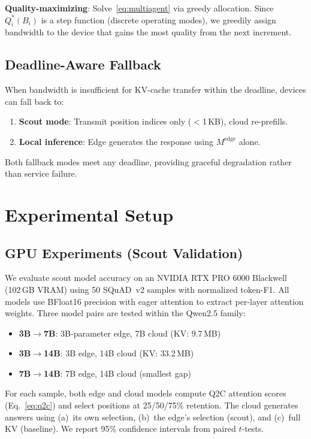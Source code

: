 \documentclass[conference]{IEEEtran}
\begin{document}
\textbf{Quality-maximizing}: Solve~\eqref{eq:multiagent} via greedy allocation.
Since $Q_i^*(B_i)$ is a step function (discrete operating modes), we greedily assign bandwidth to the device that gains the most quality from the next increment.

\subsection{Deadline-Aware Fallback}

When bandwidth is insufficient for KV-cache transfer within the deadline, devices can fall back to:
\begin{enumerate}
    \item \textbf{Scout mode}: Transmit position indices only ($<$1\,KB), cloud re-prefills.
    \item \textbf{Local inference}: Edge generates the response using $M^{\text{edge}}$ alone.
\end{enumerate}
Both fallback modes meet any deadline, providing graceful degradation rather than service failure.


\section{Experimental Setup}
\label{sec:setup}

\subsection{GPU Experiments (Scout Validation)}

We evaluate scout model accuracy on an NVIDIA RTX PRO 6000 Blackwell (102\,GB VRAM) using 50 SQuAD~v2 samples with normalized token-F1.
All models use BFloat16 precision with eager attention to extract per-layer attention weights.
Three model pairs are tested within the Qwen2.5 family:
\begin{itemize}
    \item \textbf{3B$\to$7B}: 3B-parameter edge, 7B cloud (KV: 9.7\,MB)
    \item \textbf{3B$\to$14B}: 3B edge, 14B cloud (KV: 33.2\,MB)
    \item \textbf{7B$\to$14B}: 7B edge, 14B cloud (smallest gap)
\end{itemize}

For each sample, both edge and cloud models compute Q2C attention scores (Eq.~\ref{eq:q2c}) and select positions at 25/50/75\% retention.
The cloud generates answers using (a)~its own selection, (b)~the edge's selection (scout), and (c)~full KV (baseline).
We report 95\% confidence intervals from paired $t$-tests.
\end{document}
